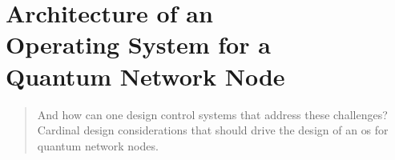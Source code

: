 \chapter
 [Architecture of an Operating System for a Quantum Network Node]
 {Architecture of an\\Operating System for a\\Quantum Network Node}
\label{chp:arch}

\begin{abstract}

And how can one design control systems that address these challenges? Cardinal design considerations
that should drive the design of an \acrlong{os} for quantum network nodes.
\end{abstract}


\newpage



\printbibliography[heading=subbibintoc,title={References}]
